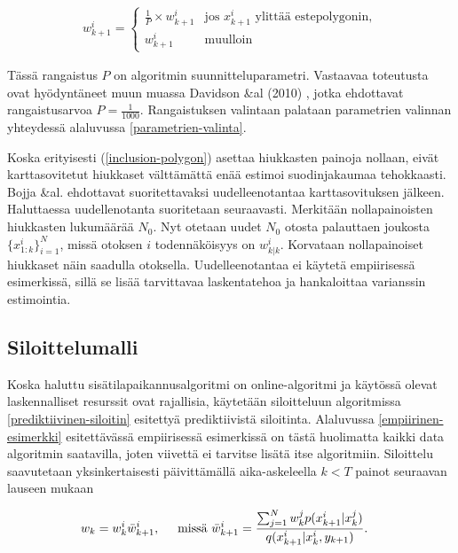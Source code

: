 \documentclass[
  12pt,
  a4paper, twoside]{book}
\begin{document}
\begin{align}\label{exclusion-polygon}
\displaystyle w^i_{k+1}={\begin{cases} \frac{1}{P} \times w^i_{k+1}&\text{jos } x^i_{k+1} \text{ ylittää estepolygonin},\\
w^i_{k+1}& \text{muulloin }\end{cases}}\end{align}

Tässä rangaistus \(P\) on algoritmin suunnitteluparametri. Vastaavaa toteutusta ovat hyödyntäneet muun muassa Davidson \&al (2010) \citep{Davidson-2010}, jotka ehdottavat rangaistusarvoa \(P=\frac{1}{1000}\). Rangaistuksen valintaan palataan parametrien valinnan yhteydessä alaluvussa \ref{parametrien-valinta}.

Koska erityisesti (\ref{inclusion-polygon}) asettaa hiukkasten painoja nollaan, eivät karttasovitetut hiukkaset välttämättä enää estimoi suodinjakaumaa tehokkaasti. Bojja \&al. \citep{Bojja-2015} ehdottavat suoritettavaksi uudelleenotantaa karttasovituksen jälkeen. Haluttaessa uudellenotanta suoritetaan seuraavasti. Merkitään nollapainoisten hiukkasten lukumäärää \(N_0\). Nyt otetaan uudet \(N_0\) otosta palauttaen joukosta \(\{x_{1:k}^i\}_{i=1}^N\), missä otoksen \(i\) todennäköisyys on \(w^i_{k|k}\). Korvataan nollapainoiset hiukkaset näin saadulla otoksella. Uudelleenotantaa ei käytetä empiirisessä esimerkissä, sillä se lisää tarvittavaa laskentatehoa ja hankaloittaa varianssin estimointia.

\subsection{Siloittelumalli} \label{siloittelumalli}

Koska haluttu sisätilapaikannusalgoritmi on online-algoritmi ja käytössä olevat laskennalliset resurssit ovat rajallisia, käytetään siloitteluun algoritmissa \ref{prediktiivinen-siloitin} esitettyä prediktiivistä siloitinta. Alaluvussa \ref{empiirinen-esimerkki} esitettävässä empiirisessä esimerkissä on tästä huolimatta kaikki data algoritmin saatavilla, joten viivettä ei tarvitse lisätä itse algoritmiin. Siloittelu saavutetaan yksinkertaisesti päivittämällä aika-askeleella \(k < T\) painot seuraavan lauseen mukaan

\begin{align}
&w_k = w_k^i \bar{w}^i_{k+1}, \hspace{0.5cm} \text{missä } \bar{w}^i_{k+1} = \frac{\sum_{j=1}^{N}w_{k}^j p(x_{k+1}^i|x_k^j)}{q(x_{k+1}^i|x_k^i,y_{k+1})}
.\end{align}
\end{document}
